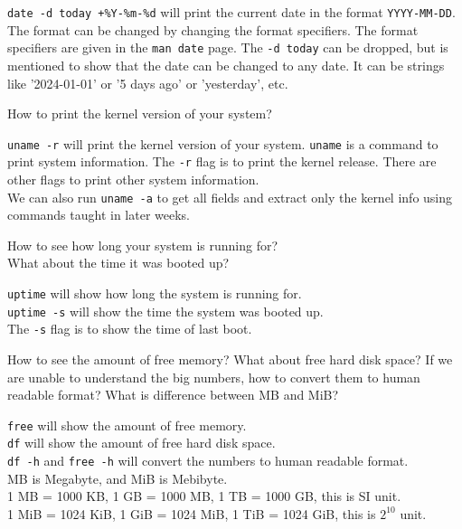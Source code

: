 \begin{ans}
  \texttt{date -d today +\%Y-\%m-\%d} will print the current date in the format
  \texttt{YYYY-MM-DD}. The format can be changed by changing the format specifiers.
  The format specifiers are given in the \texttt{man date} page. The \texttt{-d today} can
  be dropped, but is mentioned to show that the date can be changed to any date.
  It can be strings like '2024-01-01' or '5 days ago' or 'yesterday', etc.
\end{ans}

\begin{qs}
  How to print the kernel version of your system?
\end{qs}

\begin{ans}
  \texttt{uname -r} will print the kernel version of your system.
  \texttt{uname} is a command to print system information.
  The \texttt{-r} flag is to print the kernel release.
  There are other flags to print other system information. \\
  We can also run \texttt{uname -a} to get all fields and extract only the
  kernel info using commands taught in later weeks.
\end{ans}

\begin{qs}
  How to see how long your system is running for? \\
  What about the time it was booted up?
\end{qs}

\begin{ans}
  \texttt{uptime} will show how long the system is running for.\\
  \texttt{uptime -s} will show the time the system was booted up. \\
  The \texttt{-s} flag is to show the time of last boot.
\end{ans}

\begin{qs}
  How to see the amount of free memory? What about free hard disk space?
  If we are unable to understand the big numbers, how to convert them to human readable format?
  What is difference between MB and MiB?
\end{qs}

\begin{ans}
  \texttt{free} will show the amount of free memory. \\
  \texttt{df} will show the amount of free hard disk space. \\
  \texttt{df -h} and \texttt{free -h}
  will convert the numbers to human readable format. \\
  MB is Megabyte, and MiB is Mebibyte. \\
  1 MB = 1000 KB, 1 GB = 1000 MB, 1 TB = 1000 GB, this is SI unit. \\
  1 MiB = 1024 KiB, 1 GiB = 1024 MiB, 1 TiB = 1024 GiB, this is $2^{10}$ unit.
\end{ans}

